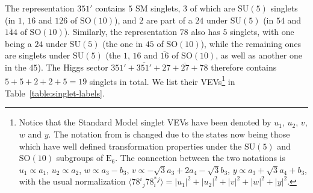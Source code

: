 \documentclass[a4paper,12pt]{article}
\def\SU{\mathrm{SU}}
\def\SO{\mathrm{SO}}
\def\EE{\mathrm{E}_6}
\begin{document}
The representation $351'$ contains $5$ SM singlets, $3$ of which are $\SU(5)$ singlets (in $1$, $16$ and $126$ of $\SO(10)$), and $2$ are part of a $24$ under $\SU(5)$ (in $54$ and $\overline{144}$ of $\SO(10)$). Similarly, the representation $78$ also has $5$ singlets, with one being a $24$ under $\SU(5)$ (the one in $45$ of $\SO(10)$), while the remaining ones are singlets under $\SU(5)$ (the $1$, $16$ and $\overline{16}$ of $\SO(10)$, as well as another one in the $45$). The Higgs sector $351'+\overline{351'}+27+\overline{27}+78$ therefore contains $5+5+2+2+5=19$ singlets in total. We list their VEVs\footnote{
Notice that the Standard Model singlet VEVs have been denoted by $u_1$, $u_2$, $v$, $w$ and $y$. The notation from \cite{Buccella:1987kc} is changed due to the states now being those which have well defined transformation properties under the $\SU(5)$ and $\SO(10)$ subgroups of $\EE$. The connection between the two notations is
$u_1\propto a_1$, $u_2\propto a_2$, $w\propto a_3-b_3$, $v\propto -\sqrt{3}a_3+2a_4-\sqrt{3}b_3$,
$y\propto a_3+\sqrt{3}a_4+b_3$, with the usual normalization
$\langle 78^{i}{}_{j} 78^{\ast}_ i{}^{j}\rangle=|u_1|^2+|u_2|^2+|v|^2+|w|^2+|y|^2$.} in Table~\ref{table:singlet-labels}.
\end{document}
